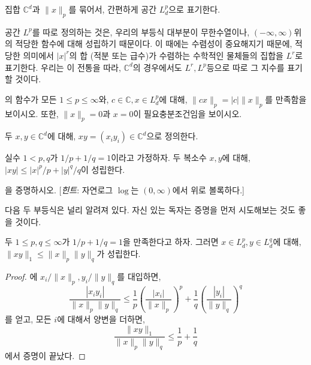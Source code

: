 \begin{definition}
    집합 $\mathbb{C}^d$과 $\|x\|_p$를 묶어서, 간편하게 공간 $L^p_d$으로 표기한다.
\end{definition}
\begin{remark}
    공간 $L^p$를 따로 정의하는 것은, 우리의 부등식 대부분이 무한수열이나, $(-\infty, \infty)$위의 적당한 함수에 대해 성립하기 때문이다.
    이 때에는 수렴성이 중요해지기 때문에, 적당한 의미에서 $|x|^r$의 합 (적분 또는 급수)가 수렴하는 수학적인 물체들의 집합을 $L^r$로 표기한다.
    우리는 이 전통을 따라, $\mathbb{C}^d$의 경우에서도 $L^r, L^p$등으로 따로 그 지수를 표기할 것이다.
\end{remark}
\begin{exercise}
    의 함수가 모든 $1 \leq p \leq \infty$와, $c \in \mathbb{C}, x \in L^p_d$에 대해, $\|cx\|_p = |c|\|x\|_p$를 만족함을 보이시오.
    또한, $\|x\|_p = 0$과 $x = 0$이 필요충분조건임을 보이시오.
\end{exercise}

\begin{definition}
\label{def:lpspace1}
    두 $x, y \in \mathbb{C}^d$에 대해, $xy = (x_i y_i) \in \mathbb{C}^d$으로 정의한다.
\end{definition}
\begin{lemma}
\label{lem:ineqyoung1}
    실수 $1 < p, q$가 $1/p + 1/q = 1$이라고 가정하자.
    두 복소수 $x, y$에 대해, $|xy| \leq |x|^p/p + |y|^q/q$이 성립한다.
\end{lemma}
\begin{exercise}
    을 증명하시오. [\textit{힌트}: 자연로그 $\log$는 $(0, \infty)$에서 위로 볼록하다.]
\end{exercise}

다음 두 부등식은 널리 알려져 있다.
자신 있는 독자는 증명을 먼저 시도해보는 것도 좋을 것이다.

\begin{theorem}[H\"older]
\label{thm:holderineq}
    두 $1 \leq p, q \leq \infty$가 $1/p + 1/q = 1$을 만족한다고 하자.
    그러면 $x \in L^p_d, y \in L^q_d$에 대해, $\|xy\|_1 \leq \|x\|_p \|y\|_q$가 성립한다.
\end{theorem}
\begin{proof}
    에 $x_i/\|x\|_p, {y_i}/\|y\|_q$를 대입하면,
    \begin{equation*}
        \frac{|x_i {y_i} |}{\|x\|_p \|y\|_q} \leq \frac{1}{p} \left(\frac{|x_i|}{\|x\|_p}\right)^p + \frac{1}{q} \left(\frac{|{y_i}|}{\|y\|_q}\right)^q
    \end{equation*}
    를 얻고, 모든 $i$에 대해서 양변을 더하면,
    \begin{equation*}
        \frac{\|xy\|_1}{\|x\|_p \|y\|_q} \leq \frac{1}{p} + \frac{1}{q}
    \end{equation*}
    에서 증명이 끝났다.
\end{proof}

